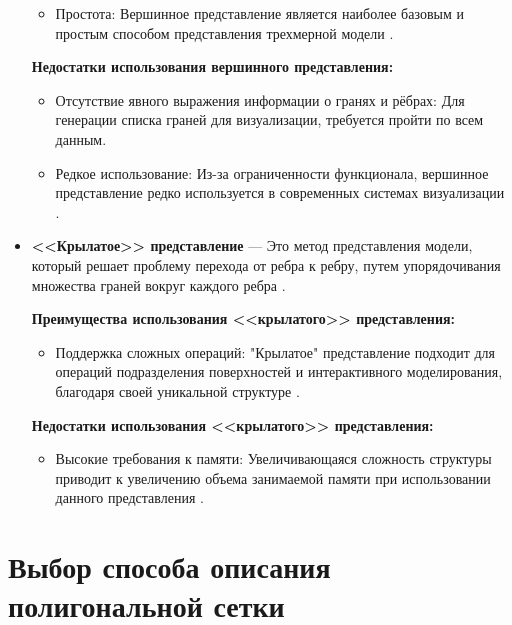 \begin{itemize}
	\begin{itemize}
		\item Простота: Вершинное представление является наиболее базовым и простым способом представления трехмерной модели \cite{polygon_mesh}.
	\end{itemize}

	\textbf{Недостатки использования вершинного представления:}

	\begin{itemize}
		\item Отсутствие явного выражения информации о гранях и рёбрах: Для генерации списка граней для визуализации, требуется пройти по всем данным.
		\item Редкое использование: Из-за ограниченности функционала, вершинное представление редко используется в современных системах визуализации \cite{polygon_mesh}.
	\end{itemize}
	
	\item \textbf{<<Крылатое>> представление} --- Это метод представления модели, который решает проблему перехода от ребра к ребру, путем упорядочивания множества граней вокруг каждого ребра \cite{polygon_mesh}.

	\textbf{Преимущества использования <<крылатого>> представления:}

	\begin{itemize}
		\item Поддержка сложных операций: "Крылатое" представление подходит для операций подразделения поверхностей и интерактивного моделирования, благодаря своей уникальной структуре \cite{polygon_mesh}.
		\end{itemize}

	\textbf{Недостатки использования <<крылатого>> представления:}

	\begin{itemize}
		\item Высокие требования к памяти: Увеличивающаяся сложность структуры приводит к увеличению объема занимаемой памяти при использовании данного представления \cite{polygon_mesh}.
	\end{itemize}
	
\end{itemize}

\section*{Выбор способа описания полигональной сетки} %

